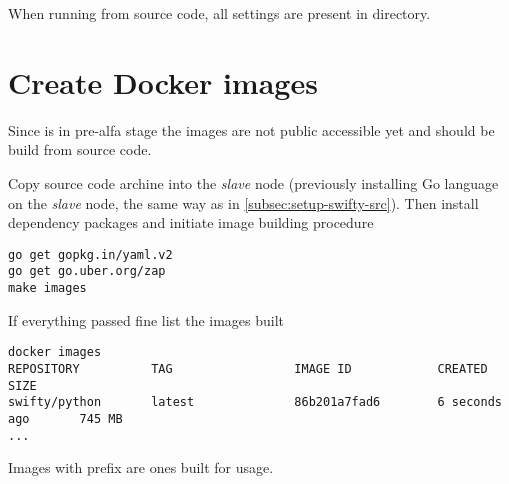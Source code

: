 When running from  source code, all settings are present
in  directory.

\section{Create Docker images}
\label{sec:setup-images}

Since  is in pre-alfa stage the images are not public
accessible yet and should be build from  source code.

Copy source code archine into the \emph{slave} node (previously
installing Go language on the \emph{slave} node, the same way
as in \ref{subsec:setup-swifty-src}). Then install dependency packages
and initiate image building procedure

\begin{lstlisting}
go get gopkg.in/yaml.v2
go get go.uber.org/zap
make images
\end{lstlisting}

If everything passed fine list the images built

\begin{lstlisting}
docker images
REPOSITORY          TAG                 IMAGE ID            CREATED             SIZE
swifty/python       latest              86b201a7fad6        6 seconds ago       745 MB
...
\end{lstlisting}

Images with  prefix are ones built for  usage.
